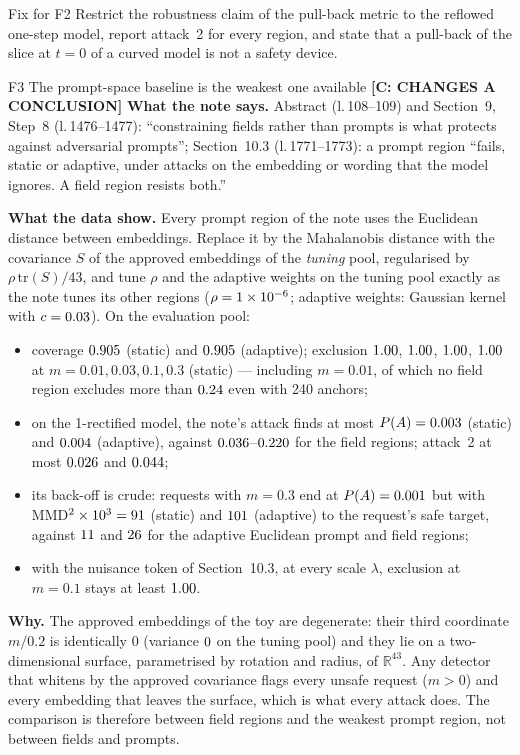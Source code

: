 \documentclass[11pt]{article}
\newcommand{\RR}{\mathbb{R}}
\newcommand{\lin}[1]{l.\,#1}
\newcommand{\badge}[2]{\textcolor{#1}{\textbf{[#2]}}}
\newcommand{\Sconc}{\badge{errRed}{C: CHANGES A CONCLUSION}}
\begin{document}
\begin{fixbox}{Fix for F2}
Restrict the robustness claim of the pull-back metric to the reflowed one-step model, report attack~2 for every region, and
state that a pull-back of the slice at $t=0$ of a curved model is not a safety device.
\end{fixbox}

\begin{findbox}{F3 \quad The prompt-space baseline is the weakest one available \hfill \Sconc}
\textbf{What the note says.} Abstract (\lin{108--109}) and Section~9, Step~8 (\lin{1476--1477}): ``constraining fields rather than
prompts is what protects against adversarial prompts''; Section~10.3 (\lin{1771--1773}): a prompt region ``fails, static or
adaptive, under attacks on the embedding or wording that the model ignores. A field region resists both.''

\smallskip\textbf{What the data show.} Every prompt region of the note uses the Euclidean distance between embeddings. Replace it by
the Mahalanobis distance with the covariance $S$ of the approved embeddings of the \emph{tuning} pool, regularised by
$\rho\,\mathrm{tr}(S)/43$, and tune $\rho$ and the adaptive weights on the tuning pool exactly as the note tunes its other regions
($\rho=1\times10^{-6}$; adaptive weights: Gaussian kernel with $c=0.03$). On the evaluation pool:
\begin{itemize}[leftmargin=1.3em,itemsep=1pt,topsep=2pt]
\item coverage $0.905$ (static) and $0.905$ (adaptive); exclusion $1.00$, $1.00$, $1.00$, $1.00$ at $m=0.01,0.03,0.1,0.3$ (static) ---
including $m=0.01$, of which no field region excludes more than $0.24$ even with 240 anchors;
\item on the 1-rectified model, the note's attack finds at most $P(A)=0.003$ (static) and $0.004$ (adaptive), against
$0.036$--$0.220$ for the field regions; attack~2 at most $0.026$ and $0.044$;
\item its back-off is crude: requests with $m=0.3$ end at $P(A)=0.001$ but with MMD$^2\times10^3=91$ (static) and $101$
(adaptive) to the request's safe target, against $11$ and $26$ for the adaptive Euclidean prompt and field regions;
\item with the nuisance token of Section~10.3, at every scale $\lambda$, exclusion at $m=0.1$ stays at least $1.00$.
\end{itemize}
\textbf{Why.} The approved embeddings of the toy are degenerate: their third coordinate $m/0.2$ is identically $0$ (variance $0$ on
the tuning pool) and they lie on a two-dimensional surface, parametrised by rotation and radius, of $\RR^{43}$. Any detector that
whitens by the approved covariance flags every unsafe request ($m>0$) and every embedding that leaves the surface, which is what
every attack does. The comparison is therefore between field regions and the weakest prompt region, not between fields and prompts.
\end{findbox}
\end{document}
